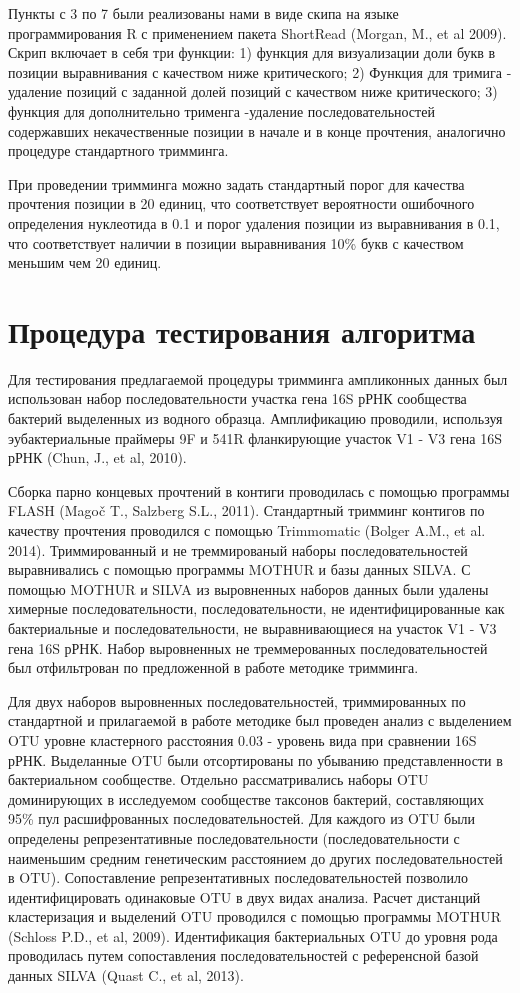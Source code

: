 \documentclass[a4paper,12pt,openany,final]{extreport}
\begin{document}
Пункты с 3 по 7 были реализованы нами в виде скипа на языке
программирования R с применением пакета ShortRead (Morgan, M., et al
2009). Скрип включает в себя три функции: 1) функция для визуализации
доли букв в позиции выравнивания с качеством ниже критического; 2)
Функция для тримига - удаление позиций с заданной долей позиций с
качеством ниже критического; 3) функция для дополнительно трименга
-удаление последовательностей содержавших некачественные позиции в
начале и в конце прочтения, аналогично процедуре стандартного тримминга.

При проведении тримминга можно задать стандартный порог для качества
прочтения позиции в 20 единиц, что соответствует вероятности ошибочного
определения нуклеотида в 0.1 и порог удаления позиции из выравнивания в
0.1, что соответствует наличии в позиции выравнивания 10\% букв с
качеством меньшим чем 20 единиц.

\section{Процедура тестирования алгоритма}

Для
тестирования предлагаемой процедуры тримминга ампликонных данных был
использован набор последовательности участка гена 16S рРНК сообщества
бактерий выделенных из водного образца. Амплификацию проводили,
используя эубактериальные праймеры 9F и 541R фланкирующие участок V1 -
V3 гена 16S рРНК (Chun, J., et al, 2010).

Сборка парно концевых прочтений в контиги проводилась с помощью
программы FLASH (Magoč T., Salzberg S.L., 2011). Стандартный тримминг
контигов по качеству прочтения проводился с помощью Trimmomatic (Bolger
A.M., et al. 2014). Триммированный и не треммированый наборы
последовательностей выравнивались с помощью программы MOTHUR и базы
данных SILVA. С помощью MOTHUR и SILVA из выровненных наборов данных
были удалены химерные последовательности, последовательности, не
идентифицированные как бактериальные и последовательности, не
выравнивающиеся на участок V1 - V3 гена 16S рРНК. Набор выровненных не
треммерованных последовательностей был отфильтрован по предложенной в
работе методике тримминга.

Для двух наборов выровненных последовательностей, триммированных по
стандартной и прилагаемой в работе методике был проведен анализ с
выделением OTU уровне кластерного расстояния 0.03 - уровень вида при
сравнении 16S рРНК. Выделанные OTU были отсортированы по убыванию
представленности в бактериальном сообществе. Отдельно рассматривались
наборы OTU доминирующих в исследуемом сообществе таксонов бактерий,
составляющих 95\% пул расшифрованных последовательностей. Для каждого из
OTU были определены репрезентативные последовательности
(последовательности с наименьшим средним генетическим расстоянием до
других последовательностей в OTU). Сопоставление репрезентативных
последовательностей позволило идентифицировать одинаковые OTU в двух
видах анализа. Расчет дистанций кластеризация и выделений OTU проводился
с помощью программы MOTHUR (Schloss P.D., et al, 2009). Идентификация
бактериальных OTU до уровня рода проводилась путем сопоставления
последовательностей с референсной базой данных SILVA (Quast C., et al,
2013).
\end{document}
